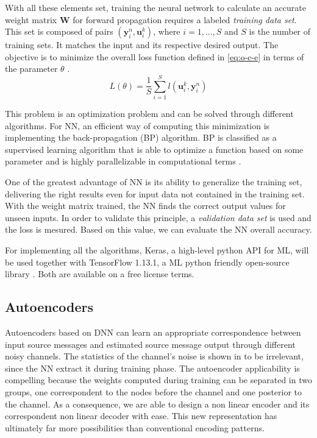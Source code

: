 \documentclass[conference]{IEEEtran}
\begin{document}
With all these elements set, training the neural network to calculate an accurate weight matrix $\textbf{W}$ for forward propagation requires a labeled \textit{training data set}. This set is composed of pairs $ (\textbf{y}_{i}^{n}, {\mathbf{u}}_i^k) $, where $i=1,...,S$ and $S$ is the number of training sets. It matches the input and its respective desired output. The objective is to minimize the overall loss function defined in \eqref{eq:o-c-e} in terms of the parameter $\theta$ \cite{DBLP:journals/corr/OSheaH17}. 
\begin{equation}\label{eq:o-c-e}
L\left( \theta \right) =\dfrac {1}{S}\sum ^{S}_{i=1}l\left({\mathbf{u}}_i^k  , \textbf{y}_{i}^{n}\right)	
\end{equation}  

This problem is an optimization problem and can be solved through different algorithms. For NN, an efficient way of computing this minimization is implementing the back-propagation (BP) algorithm. 	BP is classified as a supervised learning algorithm that is able to optimize a function based on some parameter and is highly parallelizable in computational terms \cite{Ibnkahla}\cite{nielsenneural}.

One of the greatest advantage of NN is its ability to generalize the training set, delivering the right results even for input data not contained in the training set. With the weight matrix trained, the NN finds the correct output values for unseen inputs. In order to validate this principle, a \textit{validation data set} is used and the loss is mesured. Based on this value, we can evaluate the NN overall accuracy.

For implementing all the algorithms, Keras, a high-level python API for ML, will be used together with TensorFlow 1.13.1, a ML python friendly open-source library \cite{DBLP:journals/corr/AbadiABBCCCDDDG16} \cite{chollet2015keras}. Both are available on a free license terms.




\subsection{Autoencoders}

Autoencoders based on DNN can learn an appropriate correspondence between input source messages and estimated source message output through different noisy channels. The statistics of the channel's noise is shown in \cite{2017arXiv171008379G} to be irrelevant, since the NN extract it during training phase. The autoencoder applicability is compelling because the weights computed during training can be separated in two groups, one correspondent to the nodes before the channel and one posterior to the channel. As a consequence, we are able to design a non linear encoder and its correspondent non linear decoder with ease. This new representation has ultimately far more possibilities than conventional encoding patterns.
\end{document}
